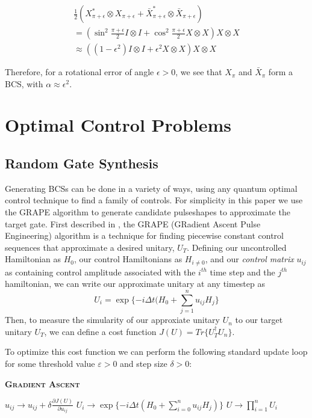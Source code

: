 \documentclass[aps,nofootinbib,pra,notitlepage,twocolumn]{revtex4-1}
\begin{document}
\begin{equation}
  \begin{gathered}
    \frac{1}{2}(X^*_{\pi + \epsilon}\otimes X_{\pi + \epsilon} + \bar X^*_{\pi + \epsilon}\otimes \bar X_{\pi + \epsilon}) \\
    = (\sin^2{\frac{\pi + \epsilon}{2}}I\otimes I + \cos^2{\frac{\pi + \epsilon}{2}}X\otimes X)X\otimes X \\
    \approx ((1 - \epsilon^2)I\otimes I + \epsilon^2X\otimes X)X\otimes X
  \end{gathered}
\end{equation}

Therefore, for a rotational error of angle $\epsilon > 0$, we see that $X_\pi$ and  $\bar X_\pi$  form a BCS, with $\alpha\approx\epsilon^2$.



\section{Optimal Control Problems}\label{ocp}
\subsection{Random Gate Synthesis}
Generating BCSs can be done in a variety of ways, using any quantum optimal control technique \cite{Caneva2011, Machnes2018} to find a family of controls. For simplicity in this paper we use the GRAPE algorithm to generate candidate pulseshapes to approximate the target gate. First described in \cite{Khaneja2005}, the GRAPE (GRadient Ascent Pulse Engineering) algorithm is a technique for finding piecewise constant control sequences that approximate a desired unitary, $U_T$. Defining our uncontrolled Hamiltonian as $H_0$, our control Hamiltonians as $H_{i\neq 0}$, and our \textit{control matrix} $u_{ij}$ as containing control amplitude associated with the $i^{th}$ time step and the $j^{th}$ hamiltonian, we can write our approximate unitary at any timestep as
\begin{equation}\label{eq:3}
  U_i = \exp\{-i\Delta t(H_0 + \sum_{j=1}^{n}u_{ij}H_{j}\}
\end{equation}
Then, to measure the simularity of our approxiate unitary $U_n$ to our target unitary $U_T$, we can define a cost function $J(U) = Tr\{U_T^{\dagger}U_n\}$.

To optimize this cost function we can perform the following standard update loop for some threshold value $\varepsilon > 0$ and step size $\delta > 0$:
\begin{algorithm}[H]
  \caption{\textsc{\textbf{Gradient Ascent}}}
  \begin{algorithmic}
    \State $u_{ij} \rightarrow u_{ij} + \delta\frac{\partial J(U)}{\partial u_{ij}}$
    \State $U_i \rightarrow \exp\{-i\Delta t(H_0 + \sum_{i=0}^{n}u_{ij}H_j)\}$
    \EndFor
    \State $U \rightarrow \prod_{i=1}^nU_i$
    \EndWhile
  \end{algorithmic}
\end{algorithm}
\end{document}
